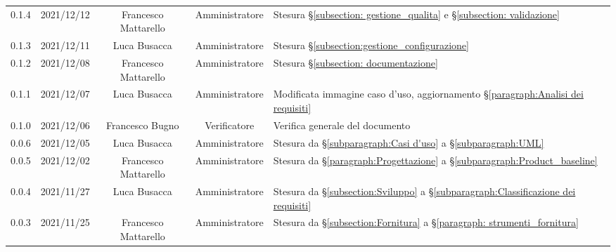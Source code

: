 \begin{center}
\begin{longtable}[c]{c | c | c | c | p{5cm}}
		0.1.4                                                      & 2021/12/12 & Francesco Mattarello & Amministratore & Stesura §\ref{subsection: gestione_qualita} e §\ref{subsection: validazione}                                                              \\
		0.1.3                                                      & 2021/12/11 & Luca Busacca         & Amministratore & Stesura  §\ref{subsection:gestione_configurazione}                                                                                        \\
		0.1.2                                                      & 2021/12/08 & Francesco Mattarello & Amministratore & Stesura §\ref{subsection: documentazione}                                                                                                 \\
		0.1.1                                                      & 2021/12/07 & Luca Busacca         & Amministratore & Modificata immagine caso d'uso, aggiornamento §\ref{paragraph:Analisi dei requisiti}                                                      \\
		0.1.0                                                      & 2021/12/06 & Francesco Bugno      & Verificatore   & Verifica generale del documento                                                                                                           \\
		0.0.6                                                      & 2021/12/05 & Luca Busacca         & Amministratore & Stesura da  §\ref{subparagraph:Casi d'uso} a §\ref{subparagraph:UML}                                                                      \\
		0.0.5                                                      & 2021/12/02 & Francesco Mattarello & Amministratore & Stesura da  §\ref{paragraph:Progettazione} a §\ref{subparagraph:Product_baseline}                                                         \\
		0.0.4                                                      & 2021/11/27 & Luca Busacca         & Amministratore & Stesura da §\ref{subsection:Sviluppo} a  §\ref{subparagraph:Classificazione dei requisiti}                                                \\
		0.0.3                                                      & 2021/11/25 & Francesco Mattarello & Amministratore & Stesura da §\ref{subsection:Fornitura} a §\ref{paragraph: strumenti_fornitura}                                                            \\

\end{longtable}
\end{center}
